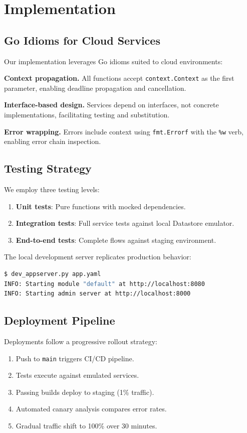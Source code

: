 \section{Implementation}


\subsection{Go Idioms for Cloud Services}

Our implementation leverages Go idioms suited to cloud environments:

\textbf{Context propagation.} All functions accept \texttt{context.Context} as the first parameter, enabling deadline propagation and cancellation.

\textbf{Interface-based design.} Services depend on interfaces, not concrete implementations, facilitating testing and substitution.

\textbf{Error wrapping.} Errors include context using \texttt{fmt.Errorf} with the \texttt{\%w} verb, enabling error chain inspection.

\subsection{Testing Strategy}

We employ three testing levels:

\begin{enumerate}
\item \textbf{Unit tests}: Pure functions with mocked dependencies.
\item \textbf{Integration tests}: Full service tests against local Datastore emulator.
\item \textbf{End-to-end tests}: Complete flows against staging environment.
\end{enumerate}

The local development server replicates production behavior:

\begin{lstlisting}[language=bash,caption=Local development]
$ dev_appserver.py app.yaml
INFO: Starting module "default" at http://localhost:8080
INFO: Starting admin server at http://localhost:8000
\end{lstlisting}

\subsection{Deployment Pipeline}

Deployments follow a progressive rollout strategy:

\begin{enumerate}
\item Push to \texttt{main} triggers CI/CD pipeline.
\item Tests execute against emulated services.
\item Passing builds deploy to staging (1\% traffic).
\item Automated canary analysis compares error rates.
\item Gradual traffic shift to 100\% over 30 minutes.
\end{enumerate}

